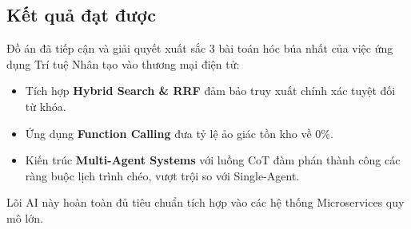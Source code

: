 \subsection{Kết quả đạt được}
Đồ án đã tiếp cận và giải quyết xuất sắc 3 bài toán hóc búa nhất của việc ứng dụng Trí tuệ Nhân tạo vào thương mại điện tử:
\begin{itemize}
    \item Tích hợp \textbf{Hybrid Search \& RRF} đảm bảo truy xuất chính xác tuyệt đối từ khóa.
    \item Ứng dụng \textbf{Function Calling} đưa tỷ lệ ảo giác tồn kho về 0\%.
    \item Kiến trúc \textbf{Multi-Agent Systems} với luồng CoT đàm phán thành công các ràng buộc lịch trình chéo, vượt trội so với Single-Agent.
\end{itemize}
Lõi AI này hoàn toàn đủ tiêu chuẩn tích hợp vào các hệ thống Microservices quy mô lớn.
